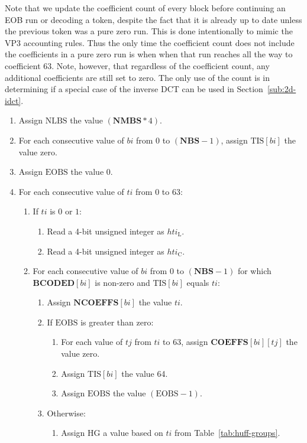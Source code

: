 \documentclass[9pt,letterpaper]{book}
\newcommand{\idx}[1]{{\ensuremath{\mathit{#1}}}}
\newcommand{\hti}{\idx{hti}}
\newcommand{\bi}{\idx{bi}}
\newcommand{\ti}{\idx{ti}}
\newcommand{\tj}{\idx{tj}}
\newcommand{\bitvar}[1]{\ensuremath{\mathbf{\bm{#1}}}}
\newcommand{\locvar}[1]{\ensuremath{\mathrm{#1}}}
\numberwithin{equation}{chapter}
\numberwithin{figure}{chapter}
\numberwithin{table}{chapter}
\begin{document}
Note that we update the coefficient count of every block before continuing an
 EOB run or decoding a token, despite the fact that it is already up to date
 unless the previous token was a pure zero run.
This is done intentionally to mimic the VP3 accounting rules.
Thus the only time the coefficient count does not include the coefficients in a
 pure zero run is when when that run reaches all the way to coefficient 63.
Note, however, that regardless of the coefficient count, any additional
 coefficients are still set to zero.
The only use of the count is in determining if a special case of the inverse
 DCT can be used in Section~\ref{sub:2d-idct}.

\begin{enumerate}
\item
Assign \locvar{NLBS} the value $(\bitvar{NMBS}*4)$.
\item
For each consecutive value of \locvar{\bi} from 0 to $(\bitvar{NBS}-1)$,
 assign $\locvar{TIS}[\locvar{\bi}]$ the value zero.
\item
Assign \locvar{EOBS} the value 0.
\item
For each consecutive value of \locvar{\ti} from 0 to 63:
\begin{enumerate}
\item
If \locvar{\ti} is $0$ or $1$:
\begin{enumerate}
\item
Read a 4-bit unsigned integer as \locvar{\hti_L}.
\item
Read a 4-bit unsigned integer as \locvar{\hti_C}.
\end{enumerate}
\item
For each consecutive value of \locvar{\bi} from 0 to $(\bitvar{NBS}-1)$ for
 which $\bitvar{BCODED}[\locvar{\bi}]$ is non-zero and
 $\locvar{TIS}[\locvar{\bi}]$ equals \locvar{\ti}:
\begin{enumerate}
\item
Assign $\bitvar{NCOEFFS}[\locvar{\bi}]$ the value \locvar{\ti}.
\item
If \locvar{EOBS} is greater than zero:
\begin{enumerate}
\item
For each value of \locvar{\tj} from $\locvar{\ti}$ to 63, assign
 $\bitvar{COEFFS}[\locvar{\bi}][\locvar{\tj}]$ the value zero.
\item
Assign $\locvar{TIS}[\locvar{\bi}]$ the value 64.
\item
Assign \locvar{EOBS} the value $(\locvar{EOBS}-1)$.
\end{enumerate}
\item
Otherwise:
\begin{enumerate}
\item
Assign \locvar{HG} a value based on \locvar{\ti} from
 Table~\ref{tab:huff-groups}.


\end{enumerate}
\end{enumerate}
\end{enumerate}
\end{enumerate}
\end{document}
